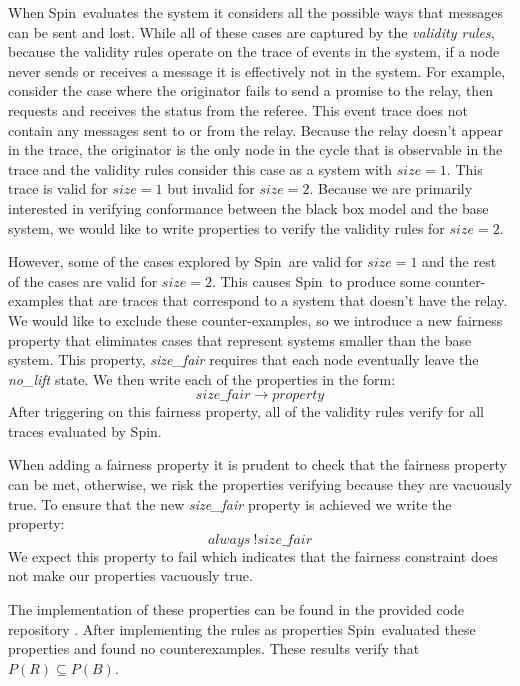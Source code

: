 \documentclass[runningheads]{llncs}
\newcommand{\spin}{Spin}
\newcommand{\coderepository}{provided code repository \cite{Storey_Extending_Model_Checking_2023}}
\newif\ifcomments
\newif\ifkylecomments
\newcommand{\egm}[1]{\ifcomments\textcolor{orange}{egm: #1}\fi}
\newcommand{\krs}[1]{\ifkylecomments\textcolor{blue}{krs: #1}\fi}
\begin{document}
When \spin\ evaluates the system it considers all the possible ways that messages can be sent and lost. While all of these cases are captured by the \emph{validity rules}, because the validity rules operate on the trace of events in the system, if a node never sends or receives a message it is effectively not in the system. 
For example, consider the case where the originator fails to send a promise to the relay, then requests and receives the status from the referee. This event trace does not contain any messages sent to or from the relay. Because the relay doesn't appear in the trace, the originator is the only node in the cycle that is observable in the trace and the validity rules consider this case as a system with $size=1$. This trace is valid for $size=1$ but invalid for $size=2$. Because we are primarily interested in verifying conformance between the black box model and the base system, we would like to write properties to verify the validity rules for $size=2$. 
\krs{Is that better? \egm{What is size in this context? Our base system has as single relay. How does that relate to size two? Also, The discussion about cases that are valid for different sizes is confusing. An example would really help the reader.}}

However, some of the cases explored by \spin\ are valid for $size=1$ and the rest of the cases are valid for $size=2$.
This causes \spin\ to produce some counter-examples that are traces that correspond to a system that doesn't have the relay. We would like to exclude these counter-examples, so we introduce a new fairness property that eliminates cases that represent systems smaller than the base system. This property, \emph{size\_fair} requires that each node eventually leave the \emph{no\_lift} state. We then write each of the properties in the form:
$$size\_fair \longrightarrow property$$
After triggering on this fairness property, all of the validity rules verify for all traces evaluated by \spin. 

When adding a fairness property it is prudent to check that the fairness property can be met, otherwise, we risk the properties verifying because they are vacuously true. To ensure that the new \emph{size\_fair} property is achieved we write the property:
$$always\ !size\_fair$$
We expect this property to fail which indicates that the fairness constraint does not make our properties vacuously true. 

The implementation of these properties can be found in the \coderepository. After implementing the rules as properties \spin\ evaluated these properties and found no counterexamples. These results verify that 
$P(R) \subseteq P(B)$.
\end{document}
